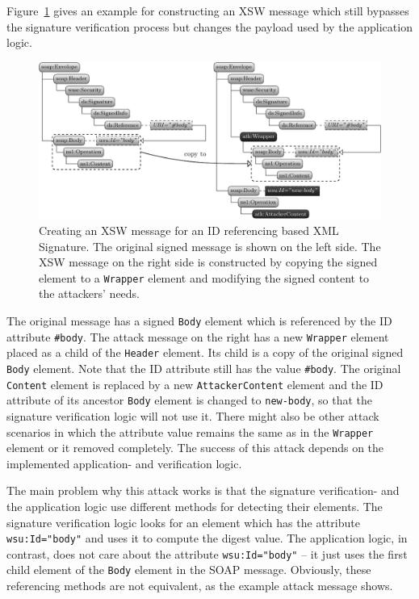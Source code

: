 Figure~\ref{fig:xsw_id} gives an example for constructing an XSW message which still bypasses the signature verification process but changes the payload used by the application logic.

\begin{figure}[ht]
    \begin{center}
        \includegraphics[width=\linewidth]{img/xsw_id}
    \end{center}
    \caption{Creating an XSW message for an ID referencing based XML Signature. 
The original signed message is shown on the left side.
The XSW message on the right side is constructed by copying the signed element to a \texttt{Wrapper} element and modifying the signed content to the attackers' needs.}
    \label{fig:xsw_id}
\end{figure}

The original message has a signed \texttt{Body} element which is referenced by the ID attribute \texttt{\#body}.
The attack message on the right has a new \texttt{Wrapper} element placed as a child of the \texttt{Header} element.
Its child is a copy of the original signed \texttt{Body} element.
Note that the ID attribute still has the value \texttt{\#body}.
The original \texttt{Content} element is replaced by a new \texttt{AttackerContent} element and the ID attribute of its ancestor \texttt{Body} element is changed to \texttt{new-body}, so that the signature verification logic will not use it.
There might also be other attack scenarios in which the attribute value remains the same as in the \texttt{Wrapper} element or it removed completely.
The success of this attack depends on the implemented application- and verification logic.

The main problem why this attack works is that the signature verification- and the application logic use different methods for detecting their elements.
The signature verification logic looks for an element which has the attribute \texttt{wsu:Id="body"} and uses it to compute the digest value.
The application logic, in contrast, does not care about the attribute \texttt{wsu:Id="body"} -- it just uses the first child element of the \texttt{Body} element in the SOAP message.
Obviously, these referencing methods are not equivalent, as the example attack message shows.

